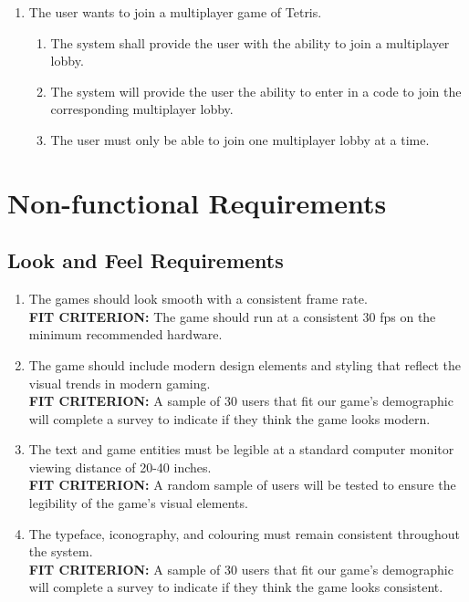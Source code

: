 \documentclass[12pt, titlepage]{article}
\begin{document}
\begin{enumerate}[{BE}1. ]
    \item The user wants to join a multiplayer game of Tetris.
    \begin{enumerate}[{FR}1. ]
    \item The system shall provide the user with the ability to join a multiplayer lobby.
    \item The system will provide the user the ability to enter in a code to join the corresponding multiplayer lobby.
    \item The user must only be able to join one multiplayer lobby at a time.
    \end{enumerate}
    
\end{enumerate}
\section{Non-functional Requirements}

\subsection{Look and Feel Requirements}
\begin{enumerate}[{LFR}1. ]
    \item The games should look smooth with a consistent frame rate.
    \\\textbf{FIT CRITERION:} The game should run at a consistent 30 fps on the minimum recommended hardware.
    
    \item The game should include modern design elements and styling that reflect the visual trends in modern gaming.
    \\\textbf{FIT CRITERION:} A sample of 30 users that fit our game's demographic will complete a survey to indicate if they think the game looks modern.
    
    \item The text and game entities must be legible at a standard computer monitor viewing distance of 20-40 inches.\cite{OSHA}
    \\\textbf{FIT CRITERION:} A random sample of users will be tested to ensure the legibility of the game's visual elements.
    
    \item The typeface, iconography, and colouring must remain consistent throughout the system.
    \\\textbf{FIT CRITERION:} A sample of 30 users that fit our game's demographic will complete a survey to indicate if they think the game looks consistent.
\end{enumerate}
\end{document}

